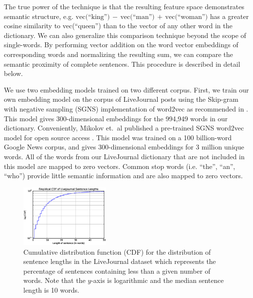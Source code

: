 \documentclass{sigchi}
\begin{document}
The true power of the technique is that the resulting feature space demonstrates semantic structure, e.g. $\text{vec(``king'')}\,{-}\, \text{vec(``man'')}\,{+}\,\text{vec(``woman'')}$ has a greater cosine similarity to vec(``queen'') than to the vector of any other word in the dictionary. We can also generalize this comparison technique beyond the scope of single-words. By performing vector addition on the word vector embeddings of corresponding words and normalizing the resulting sum, we can compare the semantic proximity of complete sentences. This procedure is described in detail below.

We use two embedding models trained on two different corpus. First, we train our own embedding model on the corpus of LiveJournal posts using the Skip-gram with negative sampling (SGNS) implementation of word2vec as recommended in \cite{MikolovSCCD13}. This model gives 300-dimensional embeddings for the 994,949 words in our dictionary. Conveniently, Mikolov et.~al published a pre-trained SGNS word2vec model for open source access \cite{word2vecWEB}. This model was trained on a 100 billion-word Google News corpus, and gives 300-dimensional embeddings for 3 million unique words. All of the words from our LiveJournal dictionary that are not included in this model are mapped to zero vectors. Common stop words (i.e. ``the'', ``an'', ``who'') provide little semantic information and are also mapped to zero vectors.


\begin{figure}[tb]
\centering \includegraphics[width=0.4\textwidth]{figures/wordCDF} 
\caption{Cumulative distribution function (CDF) for the distribution of sentence lengths in the LiveJournal dataset which represents the percentage of sentences containing less than a given number of words. Note that the $y$-axis is logarithmic and the median sentence length is 10 words. \label{fig:wordCDF}}
\end{figure}
\end{document}
